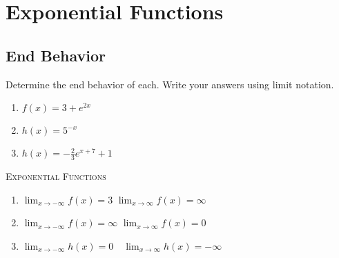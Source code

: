 \chapter{Exponential Functions}

\section{End Behavior}

Determine the end behavior of each. Write your answers using limit notation.
\begin{enumerate}
	\item $f(x) = 3 + e^{2x}$
	\item $h(x) = 5^{-x}$
	\item $h(x) = -\frac{2}{3}e^{x+7} + 1$
\end{enumerate}

\newpage

\textsc{Exponential Functions}

\begin{enumerate}
	\item $\lim_{x \to -\infty} f(x) = 3$ \quad $\lim_{x \to \infty} f(x) = \infty$
	\item $\lim_{x \to -\infty} f(x) = \infty$ \quad $\lim_{x \to \infty} f(x) =0$ 
	\item $\lim_{x \to -\infty} h(x) = 0 \quad \lim_{x \to \infty} h(x) = - \infty$
\end{enumerate}

